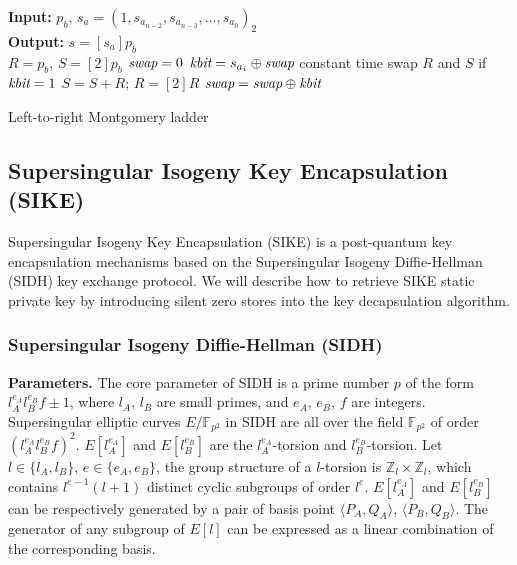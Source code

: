 \documentclass{iacrtrans}
\begin{document}
\begin{algorithm}[H]
\SetAlgoLined
\textbf{Input: } $p_b$, $s_a = (1, s_{a_{n-2}}, s_{a_{n-3}}, ..., s_{a_0})_2$ \\
\textbf{Output: } $s = [s_a]p_b$ \\
 $R = p_b$, $S = [2]p_b$\;
 $\emph{swap} = 0$\;
  {
     $\emph{kbit} = s_{a_i} \oplus \emph{swap}$\;
     constant time swap $R$ and $S$ if $\emph{kbit} =1$\;
     $S = S+R$; $R = [2]R$\; 
     $\emph{swap} = \emph{swap} \oplus \emph{kbit}$\;
  }
 \caption{Left-to-right Montgomery ladder}
 \label{tab:algML}
\end{algorithm}

\subsection{Supersingular Isogeny Key Encapsulation (SIKE)}
Supersingular Isogeny Key Encapsulation (SIKE)\cite{jao2017supersingular} is a post-quantum key encapsulation mechanisms based on the Supersingular Isogeny Diffie-Hellman (SIDH) \cite{jao2011towards} key exchange protocol. We will describe how to retrieve SIKE static private key by introducing silent zero stores into the key decapsulation algorithm. 

\subsubsection{Supersingular Isogeny Diffie-Hellman (SIDH)}

\textbf{Parameters.} The core parameter of SIDH is a prime number $p$ of the form $l_A^{e_A}l_B^{e_B}f \pm 1$, where $l_A$, $l_B$ are small primes, and $e_A$, $e_B$, $f$ are integers. Supersingular elliptic curves $E/\mathbb{F}_{p^2}$ in SIDH are all over the field $\mathbb{F}_{p^2}$ of order $(l_A^{e_A}l_B^{e_B}f)^2$. $E[l_A^{e_A}]$ and $E[l_B^{e_B}]$ are the $l_A^{e_A}$-torsion and $l_B^{e_B}$-torsion. Let $l \in \{l_A, l_B\}$, $e \in \{e_A, e_B\}$, the group structure of a $l$-torsion is $\mathbb{Z}_l \times \mathbb{Z}_l$, which contains $l^{e-1}(l+1)$ distinct cyclic subgroups of order $l^e$. $E[l_A^{e_A}]$ and $E[l_B^{e_B}]$ can be respectively generated by a pair of basis point $\langle P_A, Q_A \rangle$, $\langle P_B, Q_B \rangle$. The generator of any subgroup of $E[l]$ can be expressed as a linear combination of the corresponding basis.  
\end{document}
